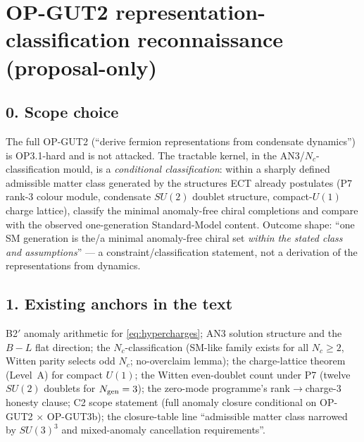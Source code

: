 \section*{OP-GUT2 representation-classification reconnaissance
(proposal-only)}

\subsection*{0. Scope choice}
The full OP-GUT2 (``derive fermion representations from condensate
dynamics'') is OP3.1-hard and is not attacked.
The tractable kernel, in the AN3/$N_c$-classification mould, is a
\emph{conditional classification}: within a sharply defined
admissible matter class generated by the structures ECT already
postulates (P7 rank-3 colour module, condensate $SU(2)$ doublet
structure, compact-$U(1)$ charge lattice), classify the minimal
anomaly-free chiral completions and compare with the observed
one-generation Standard-Model content.
Outcome shape: ``one SM generation is the/a minimal anomaly-free
chiral set \emph{within the stated class and assumptions}'' ---
a constraint/classification statement, not a derivation of the
representations from dynamics.

\subsection*{1. Existing anchors in the text}
B2$'$ anomaly arithmetic for \eqref{eq:hypercharges}; AN3 solution
structure and the $B-L$ flat direction; the $N_c$-classification
(SM-like family exists for all $N_c\ge2$, Witten parity selects
odd $N_c$; no-overclaim lemma); the charge-lattice theorem
(Level~A) for compact $U(1)$; the Witten even-doublet count under
P7 (twelve $SU(2)$ doublets for $N_{\rm gen}=3$); the zero-mode
programme's rank$\to$charge-3 honesty clause; C2 scope statement
(full anomaly closure conditional on OP-GUT2 $\times$ OP-GUT3b);
the closure-table line ``admissible matter class narrowed by
$SU(3)^3$ and mixed-anomaly cancellation requirements''.

